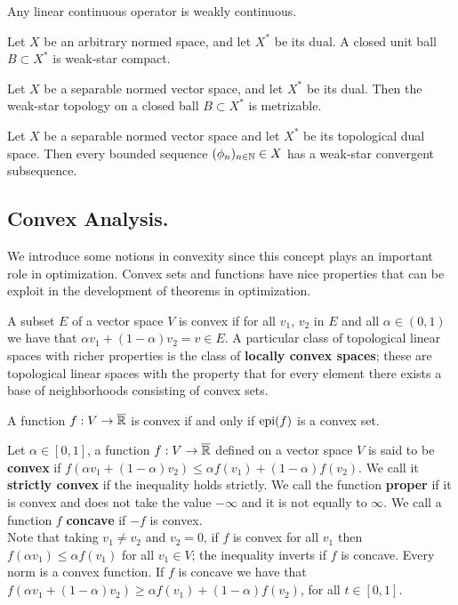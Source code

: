Any linear continuous operator is weakly continuous.
\begin{theorem}
Let $X$ be an arbitrary normed space, and let $X^*$ be its dual. A closed unit ball $B\subset X^*$ is weak-star compact.
\end{theorem}
\begin{theorem}
Let $X$ be a separable normed vector space, and let $X^*$ be its dual. Then the weak-star topology on a closed ball $B\subset X^*$ is metrizable. 
\end{theorem}
\begin{corollary} Let $X$ be a separable normed vector space and let $X^*$ be its topological dual space. Then every bounded sequence $(\phi_n)_{n\in \mathbb{N}}\in X$ has a weak-star convergent subsequence.
\end{corollary}

\subsection{Convex Analysis.}
We introduce some notions in convexity since this concept plays an important role in optimization. Convex sets and functions have nice properties that can be exploit in the development of theorems in optimization. 
 
A subset $E$ of a vector space $V$ is convex if for all $v_1$, $v_2$ in $E$ and all $\alpha \in (0,1)$ we have that $\alpha v_1+(1-\alpha)v_2=v\in E$.
A particular class of topological linear spaces with richer properties is the class of\textbf{ locally convex spaces}; these are topological linear spaces with the property that for every element there exists a base of neighborhoods consisting of convex sets.

 
A function $f: V \rightarrow \overline{\mathbb{R}}$ is convex if and only if $\mathrm{epi}(f)$ is a convex set.

Let $\alpha\in [0,1]$, a function $f:V\rightarrow \overline{\mathbb{R}}$ defined on a vector space $V$ is said to be \textbf{convex} if $f(\alpha v_1+(1-\alpha)v_2)\leq \alpha f(v_1)+(1-\alpha)f(v_2)$. We call it \textbf{strictly convex} if the inequality holds strictly. We call the function \textbf{proper} if it is convex and does not take the value $-\infty$ and it is not equally to $\infty$. We call a function $f$ \textbf{concave} if $-f$ is convex. \\

Note that taking $v_1\neq v_2$ and $v_2=0$, if $f$ is convex for all $v_1$ then $f(\alpha v_1)\leq \alpha f(v_1)$ for all $v_1\in V$; the inequality inverts if $f$ is concave. Every norm is a convex function. If $f$ is concave we have that $f(\alpha v_1+(1-\alpha)v_2)\geq \alpha f(v_1)+(1-\alpha)f(v_2)$, for all $t\in [0,1]$.

